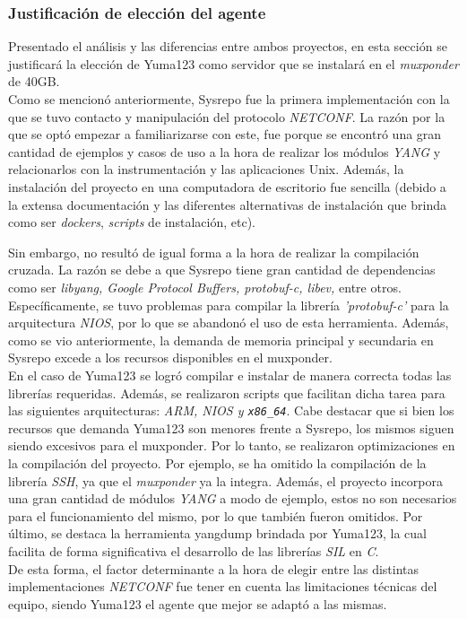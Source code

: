 	\subsubsection{Justificación de elección del agente}

	Presentado el análisis y las diferencias entre ambos proyectos, en esta sección se justificará la elección de Yuma123 como servidor que se instalará en el \textit{muxponder} de 40GB.
	\\
	
	Como se mencionó anteriormente, Sysrepo fue la primera implementación con la que se tuvo contacto y manipulación del protocolo \textit{NETCONF}. La razón por la que se optó empezar a familiarizarse con este, fue porque se encontró una gran cantidad de ejemplos y casos de uso a la hora de realizar los módulos \textit{YANG} y relacionarlos con la instrumentación y las aplicaciones Unix. Además, la instalación del proyecto en una computadora de escritorio fue sencilla (debido a la extensa documentación y las diferentes alternativas de instalación que brinda como ser \textit{dockers}, \textit{scripts} de instalación, etc).

	Sin embargo, no resultó de igual forma a la hora de realizar la compilación cruzada. La razón se debe a que Sysrepo tiene gran cantidad de dependencias como ser \textit{libyang, Google Protocol Buffers, protobuf-c, libev,} entre otros. Específicamente, se tuvo problemas para compilar la librería \textit{'protobuf-c'} para la arquitectura \textit{NIOS}, por lo que se abandonó el uso de esta herramienta. Además, como se vio anteriormente, la demanda de memoria principal y secundaria en Sysrepo excede a los recursos disponibles en el muxponder.
	\\

	En el caso de Yuma123 se logró compilar e instalar de manera correcta todas las librerías requeridas. Además, se realizaron scripts que facilitan dicha tarea para las siguientes arquitecturas: \textit{ARM, NIOS y \texttt{x86\_64}}. Cabe destacar que si bien los recursos que demanda Yuma123 son menores frente a Sysrepo, los mismos siguen siendo excesivos para el muxponder. Por lo tanto, se realizaron optimizaciones en la compilación del proyecto. Por ejemplo, se ha omitido la compilación de la librería \textit{SSH}, ya que el \textit{muxponder} ya la integra. Además, el proyecto incorpora una gran cantidad de módulos \textit{YANG} a modo de ejemplo, estos no son necesarios para el funcionamiento del mismo, por lo que también fueron omitidos. Por último, se destaca la herramienta yangdump brindada por Yuma123, la cual facilita de forma significativa el desarrollo de las librerías \textit{SIL} en \textit{C}.
	\\

	De esta forma, el factor determinante a la hora de elegir entre las distintas implementaciones \textit{NETCONF} fue tener en cuenta las limitaciones técnicas del equipo, siendo Yuma123 el agente que mejor se adaptó a las mismas. 
